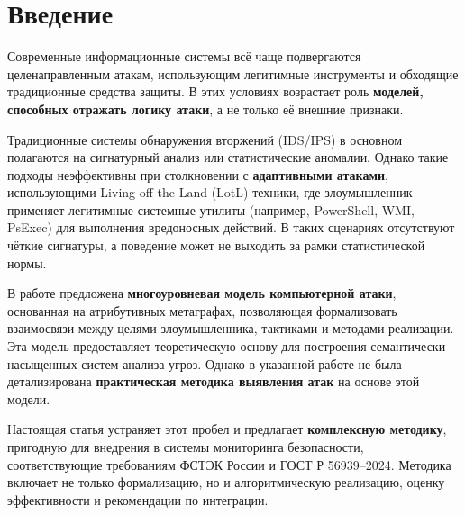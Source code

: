 \section{Введение}

Современные информационные системы всё чаще подвергаются целенаправленным атакам, использующим легитимные инструменты и обходящие традиционные средства защиты. В этих условиях возрастает роль \textbf{моделей, способных отражать логику атаки}, а не только её внешние признаки.

Традиционные системы обнаружения вторжений (IDS/IPS) в основном полагаются на сигнатурный анализ или статистические аномалии. Однако такие подходы неэффективны при столкновении с \textbf{адаптивными атаками}, использующими Living-off-the-Land (LotL) техники, где злоумышленник применяет легитимные системные утилиты (например, PowerShell, WMI, PsExec) для выполнения вредоносных действий. В таких сценариях отсутствуют чёткие сигнатуры, а поведение может не выходить за рамки статистической нормы.

В работе \cite{latypov2020multilevel} предложена \textbf{многоуровневая модель компьютерной атаки}, основанная на атрибутивных метаграфах, позволяющая формализовать взаимосвязи между целями злоумышленника, тактиками и методами реализации. Эта модель предоставляет теоретическую основу для построения семантически насыщенных систем анализа угроз. Однако в указанной работе не была детализирована \textbf{практическая методика выявления атак} на основе этой модели.

Настоящая статья устраняет этот пробел и предлагает \textbf{комплексную методику}, пригодную для внедрения в системы мониторинга безопасности, соответствующие требованиям ФСТЭК России и ГОСТ Р 56939–2024. Методика включает не только формализацию, но и алгоритмическую реализацию, оценку эффективности и рекомендации по интеграции.